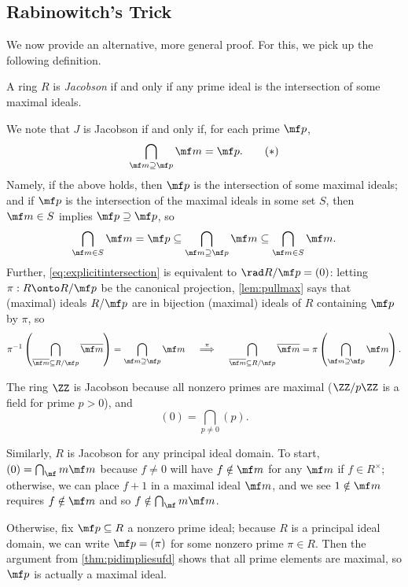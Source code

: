 \subsection{Rabinowitch's Trick}
We now provide an alternative, more general proof. For this, we pick up the following definition.
\begin{definition}[Jacobson]
	A ring $R$ is \textit{Jacobson} if and only if any prime ideal is the intersection of some maximal ideals.
\end{definition}
\begin{remark}[Nir] \label{rem:jacobsonviarad}
	We note that $J$ is Jacobson if and only if, for each prime $\mf p$,
	\[\bigcap_{\mf m\supseteq\mf p}\mf m=\mf p.\tag{$*$}\label{eq:explicitintersection}\]
	Namely, if the above holds, then $\mf p$ is the intersection of some maximal ideals; and if $\mf p$ is the intersection of the maximal ideals in some set $S$, then $\mf m\in S$ implies $\mf p\supseteq\mf p$, so
	\[\bigcap_{\mf m\in S}\mf m=\mf p\subseteq\bigcap_{\mf m\supseteq\mf p}\mf m\subseteq\bigcap_{\mf m\in S}\mf m.\]
	Further, \autoref{eq:explicitintersection} is equivalent to $\rad R/\mf p=(0)$: letting $\pi:R\onto R/\mf p$ be the canonical projection, \autoref{lem:pullmax} says that (maximal) ideals $R/\mf p$ are in bijection (maximal) ideals of $R$ containing $\mf p$ by $\pi$, so
	\[\pi^{-1}\left(\bigcap_{\overline{\mf m}\subseteq R/\mf p}\overline{\mf m}\right)=\bigcap_{\mf m\supseteq\mf p}\mf m\quad\stackrel\pi\implies\quad\bigcap_{\overline{\mf m}\subseteq R/\mf p}\overline{\mf m}=\pi\left(\bigcap_{\mf m\supseteq\mf p}\mf m\right).\]
\end{remark}
\begin{example}
	The ring $\ZZ$ is Jacobson because all nonzero primes are maximal ($\ZZ/p\ZZ$ is a field for prime $p>0$), and
	\[(0)=\bigcap_{p\ne0}(p).\]
\end{example}
\begin{example} \label{ex:pidisjacobson}
	Similarly, $R$ is Jacobson for any principal ideal domain. To start, $(0)=\bigcap_\mf m\mf m$ because $f\ne0$ will have $f\notin\mf m$ for any $\mf m$ if $f\in R^\times$; otherwise, we can place $f+1$ in a maximal ideal $\mf m$, and we see $1\notin\mf m$ requires $f\notin\mf m$ and so $f\notin\bigcap_\mf m\mf m$.

	Otherwise, fix $\mf p\subseteq R$ a nonzero prime ideal; because $R$ is a principal ideal domain, we can write $\mf p=(\pi)$ for some nonzero prime $\pi\in R$. Then the argument from \autoref{thm:pidimpliesufd} shows that all prime elements are maximal, so $\mf p$ is actually a maximal ideal.
\end{example}
